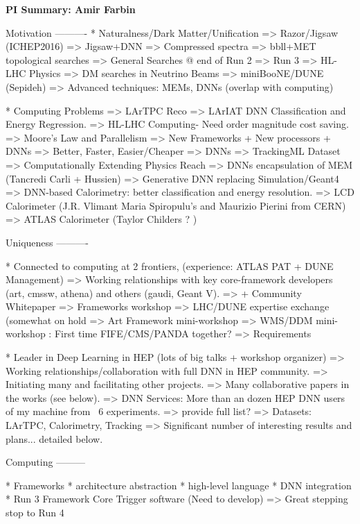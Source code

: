 
\begin{center}
\Large\textbf{PI Summary: Amir Farbin}
\end{center}

Motivation
----------
* Naturalness/Dark Matter/Unification 
   => Razor/Jigsaw (ICHEP2016) => Jigsaw+DNN
      => Compressed spectra  
      => bbll+MET topological searches 
      => General Searches @ end of Run 2 => Run 3 
      => HL-LHC Physics
   => DM searches in Neutrino Beams
      => miniBooNE/DUNE (Sepideh)
   => Advanced techniques: MEMs, DNNs (overlap with computing)

* Computing Problems
   => LArTPC Reco 
      => LArIAT DNN Classification and Energy Regression.
   => HL-LHC Computing- Need order magnitude cost saving.
      => Moore's Law and Parallelism => New Frameworks + New processors + DNNs
      => Better, Faster, Easier/Cheaper => DNNs
      => TrackingML Dataset
   => Computationally Extending Physics Reach 
      => DNNs encapsulation of MEM (Tancredi Carli + Hussien)
      => Generative DNN replacing Simulation/Geant4
      => DNN-based Calorimetry: better classification and energy resolution.
         => LCD Calorimeter (J.R. Vlimant Maria Spiropulu's and Maurizio Pierini from CERN)
         => ATLAS Calorimeter (Taylor Childers ? ) 


Uniqueness
----------

* Connected to computing at 2 frontiers, (experience: ATLAS PAT + DUNE Management)
   => Working relationships with key core-framework developers (art, cmssw, athena) and others (gaudi, Geant V). 
   => + Community Whitepaper
      => Frameworks workshop
   => LHC/DUNE expertise exchange (somewhat on hold
      => Art Framework mini-workshop
      => WMS/DDM mini-workshop : First time FIFE/CMS/PANDA together? => Requirements

* Leader in Deep Learning in HEP (lots of big talks + workshop organizer)
   => Working relationships/collaboration with full DNN in HEP community.
      => Initiating many and facilitating other projects.
      => Many collaborative papers in the works (see below).
   => DNN Services: More than an dozen HEP DNN users of my machine from ~6 experiments. 
      => provide full list?
   => Datasets: LArTPC, Calorimetry, Tracking   
   => Significant number of interesting results and plans... detailed below.

Computing
---------

* Frameworks
     * architecture abstraction
     * high-level language
     * DNN integration
  * Run 3 Framework Core Trigger software (Need to develop)
     => Great stepping stop to Run 4

